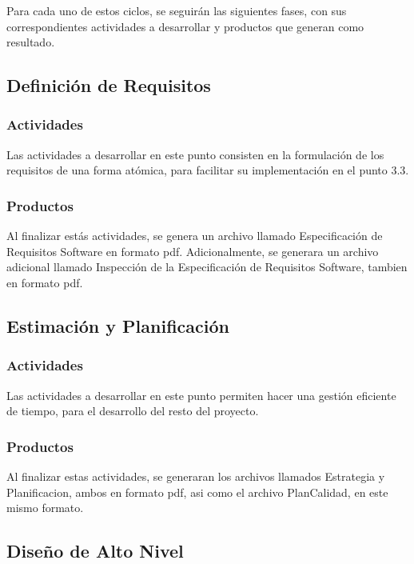 \documentclass[titlepage,a4paper]{article}
\begin{document}
Para cada uno de estos ciclos, se seguirán las siguientes fases, con sus correspondientes actividades a desarrollar y productos que generan como resultado.

\subsection{Definición de Requisitos}

\subsubsection{Actividades}

Las actividades a desarrollar en este punto consisten en la formulación de los requisitos de una forma atómica, para facilitar su implementación en el punto 3.3. 

\subsubsection{Productos}

Al finalizar estás actividades, se genera un archivo llamado Especificación de Requisitos Software en formato pdf. Adicionalmente, se generara un archivo adicional llamado Inspección de la Especificación de Requisitos Software, tambien en formato pdf.

\subsection{Estimación y Planificación}

\subsubsection{Actividades}
Las actividades a desarrollar en este punto permiten hacer una gestión eficiente de tiempo, para el desarrollo del resto del proyecto. 
\subsubsection{Productos}
Al finalizar estas actividades, se generaran los archivos llamados Estrategia y Planificacion, ambos en formato pdf, asi como el archivo PlanCalidad, en este mismo formato.

\subsection{Diseño de Alto Nivel} %
\end{document}
